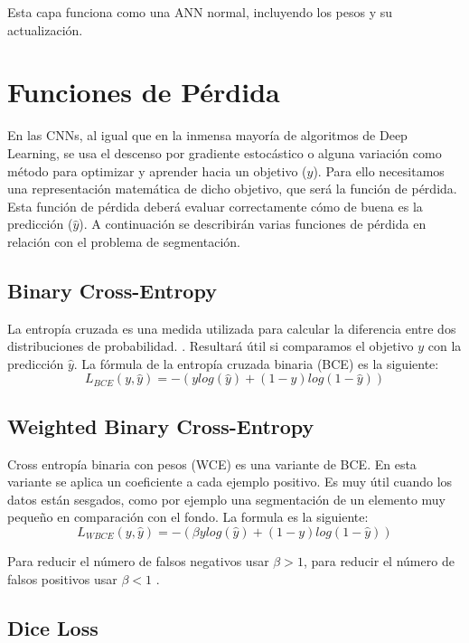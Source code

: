 Esta capa funciona como una ANN normal, incluyendo los pesos y su actualización.

\section{Funciones de Pérdida}

En las CNNs, al igual que en la inmensa mayoría de algoritmos de Deep Learning, se usa el descenso por gradiente estocástico o alguna variación como método para optimizar y aprender hacia un objetivo ($y$). Para ello necesitamos una representación matemática de dicho objetivo, que será la función de pérdida. Esta función de pérdida deberá evaluar correctamente cómo de buena es la predicción ($\hat{y}$). A continuación se describirán varias funciones de pérdida en relación con el problema de segmentación.

\subsection{Binary Cross-Entropy}

La entropía cruzada es una medida utilizada para calcular la diferencia entre dos distribuciones de probabilidad. \cite{Jadon2020}. Resultará útil si comparamos el objetivo $y$ con la predicción $\hat{y}$. La fórmula de la entropía cruzada binaria (BCE) es la siguiente:
\begin{equation}
L_{BCE}(y,\hat{y})=-(y log(\hat{y}) + (1-y)log(1-\hat{y}))
\end{equation}

\subsection{Weighted Binary Cross-Entropy}

Cross entropía binaria con pesos (WCE) es una variante de BCE. En esta variante se aplica un coeficiente a cada ejemplo positivo. Es muy útil cuando los datos están sesgados, como por ejemplo una segmentación de un elemento muy pequeño en comparación con el fondo. La formula es la siguiente:
\begin{equation}
L_{WBCE}(y,\hat{y})=-(\beta y log(\hat{y}) + (1-y)log(1-\hat{y}))
\end{equation}

Para reducir el número de falsos negativos usar $\beta > 1$, para reducir el número de falsos positivos usar $\beta < 1$ \cite{Jadon2020}.

\subsection{Dice Loss}

